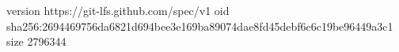 version https://git-lfs.github.com/spec/v1
oid sha256:2694469756da6821d694bee3e169ba89074dae8fd45debf6c6c19be96449a3c1
size 2796344
